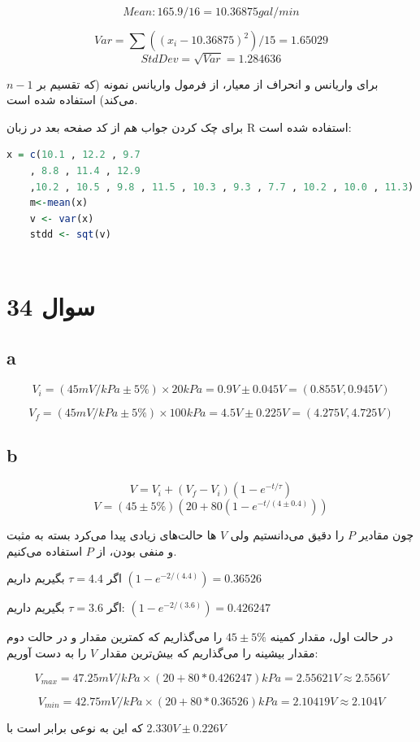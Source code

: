 \documentclass[12pt]{article}
\begin{document}
$$Mean: 165.9 / 16 = 10.36875 gal/min$$


$$Var = \sum((x_i - 10.36875)^2)/15 = 1.65029$$
$$StdDev = \sqrt{Var} = 1.284636$$


برای واریانس و انحراف از معیار،‌ از فرمول واریانس نمونه (که تقسیم بر $n-1$ می‌کند) استفاده شده است.

برای چک کردن جواب هم از کد صفحه بعد در زبان R استفاده شده است:

\begin{latin}
\begin{lstlisting}[language=R]
	x = c(10.1 , 12.2 , 9.7
	, 8.8 , 11.4 , 12.9 
	,10.2 , 10.5 , 9.8 , 11.5 , 10.3 , 9.3 , 7.7 , 10.2 , 10.0 , 11.3)
	m<-mean(x)
	v <- var(x)
	stdd <- sqt(v)
	
\end{lstlisting}
\end{latin}


\section*{سوال 34}

\subsection*{a}
$$V_i = (45 mV/kPa \pm 5\% ) \times 20 kPa = 0.9V \pm 0.045V = (0.855V , 0.945V) $$

$$V_f = (45 mV/kPa \pm 5\% ) \times 100 kPa = 4.5V \pm 0.225V = (4.275V , 4.725V) $$

\subsection*{b}

$$V = V_i + (V_f - V_i)(1 - e^{-t / \tau}) $$
$$V = (45 \pm 5\% ) (20 + 80 (1 - e^{-t /(4 \pm 0.4)}))$$


چون مقادیر $P$ را دقیق می‌دانستیم ولی $V$ ها حالت‌های زیادی پیدا می‌کرد بسته به مثبت و منفی بودن، از $P$ استفاده می‌کنیم.

اگر $\tau = 4.4$ بگیریم داریم
$(1 - e^{-2 /(4.4)}) = 0.36526$

اگر $\tau = 3.6$ بگیریم داریم:
$(1 - e^{-2 /(3.6)}) = 0.426247$

در حالت اول، مقدار کمینه $45 \pm 5\%$ را می‌گذاریم که کمترین مقدار و در حالت دوم مقدار بیشینه را می‌گذاریم که بیش‌ترین مقدار $V$ را به دست آوریم:

$$V_{max} = 47.25 mV/kPa \times (20+80*0.426247) kPa = 2.55621 V \approx 2.556 V$$

$$V_{min} = 42.75 mV/kPa \times (20+80*0.36526) kPa = 2.10419 V \approx 2.104 V$$

که این به نوعی برابر است با
 $2.330 V \pm 0.226 V$
\end{document}
